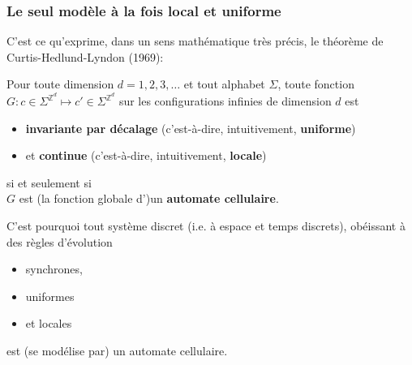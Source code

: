 \documentclass[8pt]{beamer}
\begin{document}
\frame
{
  \frametitle{Le seul modèle à la fois local et uniforme}
 
 C'est ce qu'exprime, dans un sens mathématique très précis, le théorème de Curtis-Hedlund-Lyndon (1969):
  
 \begin{theorem} Pour toute dimension $d=1,2,3,\ldots$ 
 et tout alphabet $\Sigma$, 
 toute fonction $G: c\in\Sigma^{\mathbb{Z}^d}\mapsto c'\in\Sigma^{\mathbb{Z}^d}$ sur les configurations infinies de dimension $d$ est 
 \begin{itemize}
\item {\bf invariante par décalage} (c'est-à-dire, intuitivement, {\bf uniforme})
\item et {\bf continue} (c'est-à-dire, intuitivement, {\bf locale}) 
\end{itemize}
si et seulement si\\
$G$ est (la fonction globale d')un {\bf automate cellulaire}.
  \end{theorem}
  
 \bigskip
C'est pourquoi tout système discret (i.e. à espace et temps discrets), obéissant à des règles d'évolution
\begin{itemize}
\item synchrones, 
\item uniformes 
\item et locales 
\end{itemize}

est (se modélise par) un automate cellulaire.
}
\end{document}

